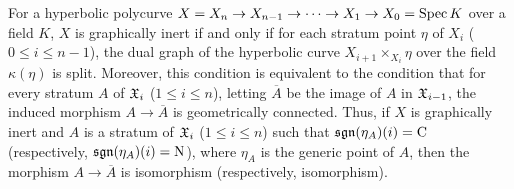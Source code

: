 \begin{rem}
  For a hyperbolic polycurve $X = X_n \to X_{n - 1} \to \cdots \to X_1 \to X_0 = \mathrm{Spec} \, K$ over a field $K$, $X$ is graphically inert if and only if for each stratum point $\eta$ of $X_i$ ($0 \leq i \leq n - 1$), the dual graph of the hyperbolic curve $X_{i + 1} \times_{X_i} \eta$ over the field $\kappa(\eta)$ is split. Moreover, this condition is equivalent to the condition that for every stratum $A$ of $\mathfrak{X}_i$ ($1 \leq i \leq n$), letting $\overline{A}$ be the image of $A$ in $\mathfrak{X}_{i - 1}$, the induced morphism $A \to \overline{A}$ is geometrically connected. Thus, if $X$ is graphically inert and $A$ is a stratum of $\mathfrak{X}_i$ ($1 \leq i \leq n$) such that $\mathfrak{sgn}(\eta_A)(i) = \mathrm{C}$ (respectively, $\mathfrak{sgn}(\eta_A)(i) = \mathrm{N}$), where $\eta_A$ is the generic point of $A$, then the morphism $A \to \overline{A}$ is isomorphism (respectively, isomorphism).
\end{rem}

